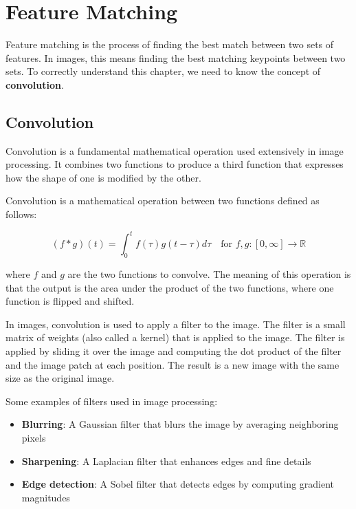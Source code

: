 \documentclass[11pt,a4paper]{article}
\theoremstyle{definition}
\theoremstyle{plain}
\theoremstyle{remark}
\begin{document}
\section{Feature Matching}

Feature matching is the process of finding the best match between two sets of features. In images, this means finding the best matching keypoints between two sets. To correctly understand this chapter, we need to know the concept of \textbf{convolution}.

\subsection{Convolution}

\begin{tcolorbox}[colback=cyan!5!white,colframe=cyan!75!black,title=\textbf{Convolution Operation}]
Convolution is a fundamental mathematical operation used extensively in image processing. It combines two functions to produce a third function that expresses how the shape of one is modified by the other.
\end{tcolorbox}

Convolution is a mathematical operation between two functions defined as follows:

\begin{equation}
    (f * g)(t) = \int_{0}^{t} f(\tau) g(t - \tau) d\tau \quad \text{for } f,g : [0,\infty] \rightarrow \mathbb{R}
\end{equation}

where $f$ and $g$ are the two functions to convolve. The meaning of this operation is that the output is the area under the product of the two functions, where one function is flipped and shifted.

In images, convolution is used to apply a filter to the image. The filter is a small matrix of weights (also called a kernel) that is applied to the image. The filter is applied by sliding it over the image and computing the dot product of the filter and the image patch at each position. The result is a new image with the same size as the original image.

\begin{tcolorbox}[colback=purple!5!white,colframe=purple!75!black,title=\textbf{Common Image Filters}]
Some examples of filters used in image processing:
\begin{itemize}
    \item \textbf{Blurring}: A Gaussian filter that blurs the image by averaging neighboring pixels
    \item \textbf{Sharpening}: A Laplacian filter that enhances edges and fine details
    \item \textbf{Edge detection}: A Sobel filter that detects edges by computing gradient magnitudes
\end{itemize}
\end{tcolorbox}
\end{document}

